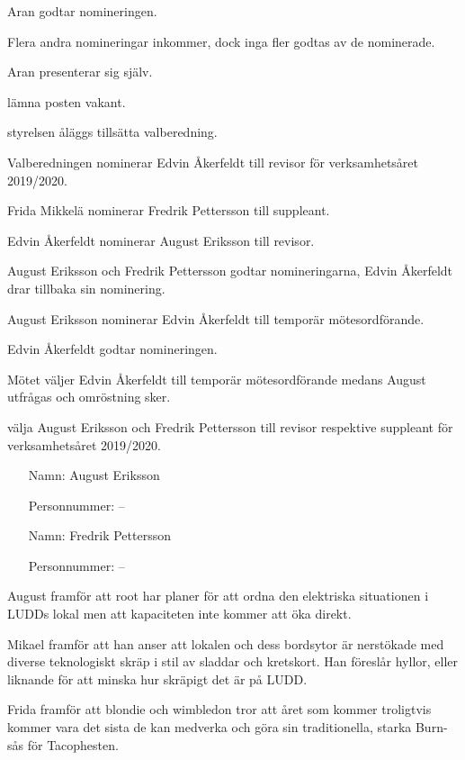\documentclass{protokoll}
\begin{document}
Aran godtar nomineringen. 

Flera andra nomineringar inkommer, dock inga fler godtas av de nominerade. 

Aran presenterar sig själv. 

\begin{beslut}
  \att lämna posten vakant. 
\end{beslut}

\begin{beslut}
  \att styrelsen åläggs tillsätta valberedning.
\end{beslut}

Valberedningen nominerar Edvin Åkerfeldt till revisor för verksamhetsåret 2019/2020.

Frida Mikkelä nominerar Fredrik Pettersson till suppleant. 

Edvin Åkerfeldt nominerar August Eriksson till revisor.

August Eriksson och Fredrik Pettersson godtar nomineringarna, Edvin Åkerfeldt 
drar tillbaka sin nominering. 

August Eriksson nominerar Edvin Åkerfeldt till temporär mötesordförande. 

Edvin Åkerfeldt godtar nomineringen. 

Mötet väljer Edvin Åkerfeldt till temporär mötesordförande medans August
utfrågas och omröstning sker. 

\begin{beslut}
  \att välja August Eriksson och Fredrik Pettersson till revisor respektive suppleant för verksamhetsåret 2019/2020.
  \begin{itemize}
    \item[Namn: ] August Eriksson %
    \item[Personnummer: ] \qquad \qquad \qquad \qquad -- \qquad \qquad
  \end{itemize}
  \begin{itemize}
    \item[Namn: ] Fredrik Pettersson
    \item[Personnummer: ] \qquad \qquad \qquad \qquad -- \qquad \qquad
  \end{itemize}
\end{beslut}


August framför att root har planer för att ordna den elektriska situationen
i LUDDs lokal men att kapaciteten inte kommer att öka direkt.

Mikael framför att han anser att lokalen och dess bordsytor är nerstökade med 
diverse teknologiskt skräp i stil av sladdar och kretskort. Han föreslår 
hyllor, eller liknande för att minska hur skräpigt det är på LUDD.

Frida framför att blondie och wimbledon tror att året som kommer troligtvis
kommer vara det sista de kan medverka och göra sin traditionella, starka 
Burn-sås för Tacophesten.
\end{document}
